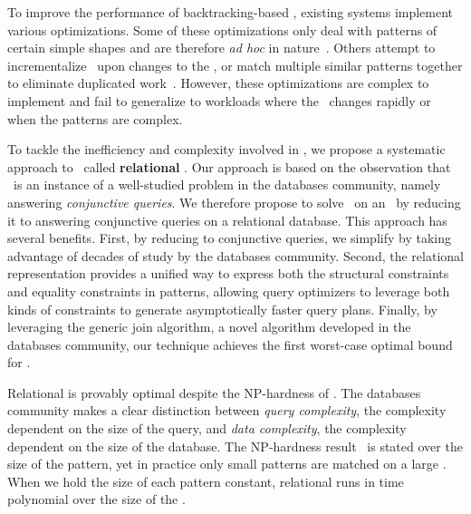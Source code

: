 To improve the performance of backtracking-based \ematching,
 existing systems implement various optimizations.
Some of these optimizations only deal with
 patterns of certain simple shapes and are therefore \textit{ad hoc}
 in nature~\cite{moskal}.
Others attempt to incrementalize \ematching\ upon changes to the \egraph,
 or match multiple similar patterns together
 to eliminate duplicated work~\cite{efficient-ematching}.
However, these optimizations are complex to implement
 and fail to generalize to workloads where the \egraph~changes rapidly
 or when the patterns are complex.


To tackle the inefficiency and complexity involved in \ematching,
 we propose a systematic approach to \ematching~called \textbf{relational \ematching}.
Our approach is based on the observation that
 \ematching\ is an instance of a well-studied problem
 in the databases community,
 namely answering {\em conjunctive queries}.
We therefore propose to solve \ematching\ on an \egraph\ by reducing it
 to answering conjunctive queries on a relational database.
This approach has several benefits.
First, by reducing \ematching to conjunctive queries,
 we simplify \ematching by taking advantage of
 decades of study by the databases community.
Second, the relational representation provides a unified way to
 express both the structural constraints and equality constraints in patterns,
 allowing query optimizers to leverage both kinds of constraints
 to generate asymptotically faster query plans.
Finally, by leveraging the generic join algorithm,
 a novel algorithm developed in the databases community,
 our technique achieves the first worst-case optimal bound for \ematching.

Relational \ematching is provably optimal despite the NP-hardness of \ematching.
The databases community makes a clear distinction between
 {\em query complexity}, the complexity dependent on the size of the query,
 and {\em data complexity}, the complexity dependent on the size of the database.
The NP-hardness result~\cite{ematching-nph} is stated over the size of the pattern,
 yet in practice only small patterns are matched on a large \egraph.
When we hold the size of each pattern constant,
 relational \ematching runs in time polynomial over the size of the \egraph.

